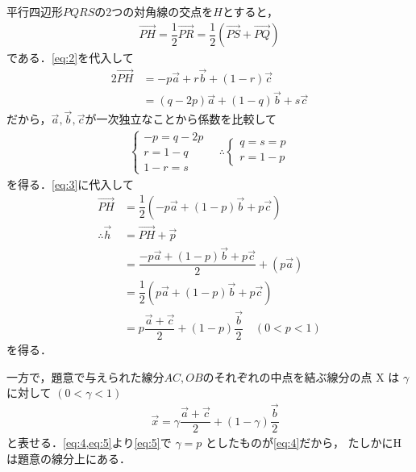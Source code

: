 \documentclass[../../main.tex]{subfiles}
\begin{document}
平行四辺形$PQRS$の2つの対角線の交点を$H$とすると，
\begin{align}
  \overrightarrow{PH}
  = \dfrac{1}{2}\overrightarrow{PR}
  = \dfrac{1}{2}(\overrightarrow{PS} + \overrightarrow{PQ}) \label{eq:3}
\end{align}
である．\cref{eq:2}を代入して
\begin{align}
  2\overrightarrow{PH}
  & = -p\vec{a} + r\vec{b} + (1-r)\vec{c} \\
  & = (q-2p)\vec{a} + (1-q)\vec{b} + s\vec{c}
\end{align}
だから，$\vec{a},\vec{b},\vec{c}$が一次独立なことから係数を比較して
\begin{align}
  \begin{cases}
    -p = q-2p \\
    r = 1-q \\
    1-r = s
  \end{cases}
  \quad \therefore
  \begin{cases}
    q = s = p \\
    r = 1-p
  \end{cases}
\end{align}
を得る．\cref{eq:3}に代入して
\begin{align}
  \overrightarrow{PH} &= \dfrac{1}{2}\left(-p\vec{a} + (1-p)\vec{b} + p \vec{c}\right) \\
  \therefore
  \vec{h}
  &= \overrightarrow{PH} + \vec{p} \\
  &= \dfrac{-p\vec{a} + (1-p)\vec{b} + p \vec{c}}{2} + \left(p\vec{a}\right) \\
  &= \dfrac{1}{2}( p\vec{a} + (1-p)\vec{b} + p\vec{c} ) \\
  &= p\dfrac{\vec{a}+\vec{c}}{2}+(1-p)\dfrac{\vec{b}}{2} \quad (0<p<1) \label{eq:4}
\end{align}
を得る．

一方で，題意で与えられた線分$AC,OB$のそれぞれの中点を結ぶ線分の点 $\text{X}$ は $\gamma$ に対して $(0 < \gamma < 1)$
\begin{align}
  \quad \vec{x} = \gamma \dfrac{\vec{a}+\vec{c}}{2} + (1-\gamma) \dfrac{\vec{b}}{2} \label{eq:5}
\end{align}
と表せる．\cref{eq:4,eq:5}より\cref{eq:5}で $\gamma = p$ としたものが\cref{eq:4}だから，
たしかに$\text{H}$ は題意の線分上にある．
\end{document}
